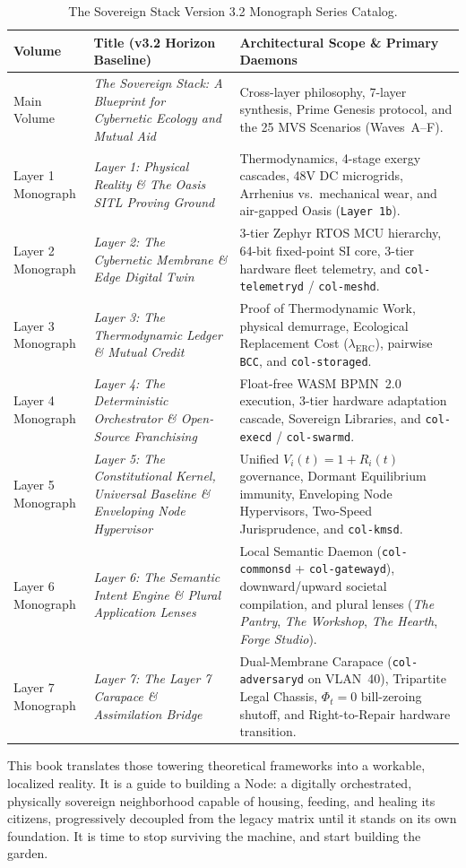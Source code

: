 \begin{table}[htbp]
\centering
\small
\begin{tabular}{|p{}|p{}|p{}|}
\hline
\textbf{Volume} & \textbf{Title (v3.2 Horizon Baseline)} & \textbf{Architectural Scope \& Primary Daemons} \\
\hline
Main Volume & \textit{The Sovereign Stack: A Blueprint for Cybernetic Ecology and Mutual Aid} & Cross-layer philosophy, 7-layer synthesis, Prime Genesis protocol, and the 25 MVS Scenarios (Waves~A--F). \\
\hline
Layer 1 Monograph & \textit{Layer 1: Physical Reality \& The Oasis SITL Proving Ground} & Thermodynamics, 4-stage exergy cascades, 48V DC microgrids, Arrhenius vs.\ mechanical wear, and air-gapped Oasis (\texttt{Layer 1b}). \\
\hline
Layer 2 Monograph & \textit{Layer 2: The Cybernetic Membrane \& Edge Digital Twin} & 3-tier Zephyr RTOS MCU hierarchy, 64-bit fixed-point SI core, 3-tier hardware fleet telemetry, and \texttt{col-telemetryd} / \texttt{col-meshd}. \\
\hline
Layer 3 Monograph & \textit{Layer 3: The Thermodynamic Ledger \& Mutual Credit} & Proof of Thermodynamic Work, physical demurrage, Ecological Replacement Cost ($\lambda_{\mathrm{ERC}}$), pairwise \texttt{BCC}, and \texttt{col-storaged}. \\
\hline
Layer 4 Monograph & \textit{Layer 4: The Deterministic Orchestrator \& Open-Source Franchising} & Float-free WASM BPMN~2.0 execution, 3-tier hardware adaptation cascade, Sovereign Libraries, and \texttt{col-execd} / \texttt{col-swarmd}. \\
\hline
Layer 5 Monograph & \textit{Layer 5: The Constitutional Kernel, Universal Baseline \& Enveloping Node Hypervisor} & Unified $V_i(t) = 1 + R_i(t)$ governance, Dormant Equilibrium immunity, Enveloping Node Hypervisors, Two-Speed Jurisprudence, and \texttt{col-kmsd}. \\
\hline
Layer 6 Monograph & \textit{Layer 6: The Semantic Intent Engine \& Plural Application Lenses} & Local Semantic Daemon (\texttt{col-commonsd} + \texttt{col-gatewayd}), downward/upward societal compilation, and plural lenses (\textit{The Pantry}, \textit{The Workshop}, \textit{The Hearth}, \textit{Forge Studio}). \\
\hline
Layer 7 Monograph & \textit{Layer 7: The Layer 7 Carapace \& Assimilation Bridge} & Dual-Membrane Carapace (\texttt{col-adversaryd} on VLAN~40), Tripartite Legal Chassis, $\Phi_t = 0$ bill-zeroing shutoff, and Right-to-Repair hardware transition. \\
\hline
\end{tabular}
\caption{The Sovereign Stack Version 3.2 Monograph Series Catalog.}
\label{tab:preface-series-catalog}
\end{table}

This book translates those towering theoretical frameworks into a workable, localized reality. It is a guide to building a Node: a digitally orchestrated, physically sovereign neighborhood capable of housing, feeding, and healing its citizens, progressively decoupled from the legacy matrix until it stands on its own foundation. It is time to stop surviving the machine, and start building the garden.
